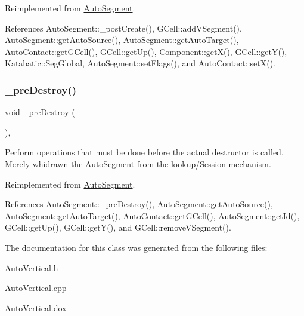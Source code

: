 Reimplemented from \mbox{\hyperlink{classKatabatic_1_1AutoSegment_a3715b38135ca24745f610bebd3407c10}{Auto\+Segment}}.



References Auto\+Segment\+::\+\_\+post\+Create(), G\+Cell\+::add\+V\+Segment(), Auto\+Segment\+::get\+Auto\+Source(), Auto\+Segment\+::get\+Auto\+Target(), Auto\+Contact\+::get\+G\+Cell(), G\+Cell\+::get\+Up(), Component\+::get\+X(), G\+Cell\+::get\+Y(), Katabatic\+::\+Seg\+Global, Auto\+Segment\+::set\+Flags(), and Auto\+Contact\+::set\+X().

\mbox{\label{classKatabatic_1_1AutoVertical_a7c13d9795eafd477994961f8a0d962d0}} 
\subsubsection{\texorpdfstring{\+\_\+pre\+Destroy()}{\_preDestroy()}}
{\footnotesize\ttfamily void \+\_\+pre\+Destroy (\begin{DoxyParamCaption}{ }\end{DoxyParamCaption})\hspace{0.3cm}{\ttfamily [protected]}, {\ttfamily [virtual]}}

Perform operations that must be done before the actual destructor is called. Merely whidrawn the \mbox{\hyperlink{classKatabatic_1_1AutoSegment}{Auto\+Segment}} from the lookup/\+Session mechanism. 

Reimplemented from \mbox{\hyperlink{classKatabatic_1_1AutoSegment_a7c13d9795eafd477994961f8a0d962d0}{Auto\+Segment}}.



References Auto\+Segment\+::\+\_\+pre\+Destroy(), Auto\+Segment\+::get\+Auto\+Source(), Auto\+Segment\+::get\+Auto\+Target(), Auto\+Contact\+::get\+G\+Cell(), Auto\+Segment\+::get\+Id(), G\+Cell\+::get\+Up(), G\+Cell\+::get\+Y(), and G\+Cell\+::remove\+V\+Segment().



The documentation for this class was generated from the following files\+:\begin{DoxyCompactItemize}
\item 
Auto\+Vertical.\+h\item 
Auto\+Vertical.\+cpp\item 
Auto\+Vertical.\+dox\end{DoxyCompactItemize}
